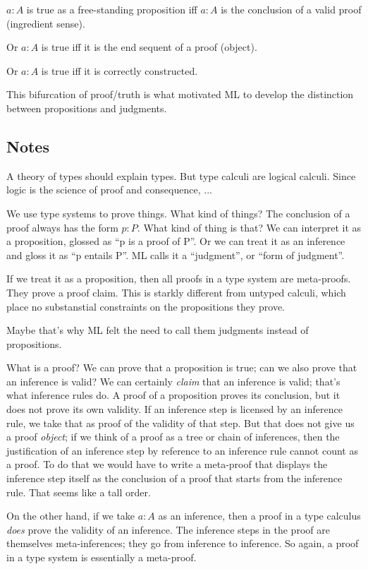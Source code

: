 \documentclass{article}
\begin{document}
 \(a:A\) is true as a free-standing proposition iff \(a:A\) is the
 conclusion of a valid proof (ingredient sense).

Or \(a:A\) is true iff it is the end sequent of a proof (object).

Or \(a:A\) is true iff it is correctly constructed.


This bifurcation of proof/truth is what motivated ML to develop the
distinction between propositions and judgments.

\subsection{Notes}
A theory of types should explain types. But type calculi are logical
calculi. Since logic is the science of proof and consequence, ...

We use type systems to prove things. What kind of things? The
conclusion of a proof always has the form \(p:P\). What kind of thing
is that? We can interpret it as a proposition, glossed as ``p is a
proof of P''. Or we can treat it as an inference and gloss it as ``p
entails P''. ML calls it a ``judgment'', or ``form of judgment''.

If we treat it as a proposition, then all proofs in a type system are
meta-proofs. They prove a proof claim. This is starkly different from
untyped calculi, which place no substanstial constraints on the
propositions they prove.

Maybe that's why ML felt the need to call them judgments instead of
propositions.

What is a proof? We can prove that a proposition is true; can we also
prove that an inference is valid? We can certainly \textit{claim} that
an inference is valid; that's what inference rules do. A proof of a
proposition proves its conclusion, but it does not prove its own
validity. If an inference step is licensed by an inference rule, we
take that as proof of the validity of that step. But that does not
give us a proof \textit{object}; if we think of a proof as a tree or
chain of inferences, then the justification of an inference step by
reference to an inference rule cannot count as a proof. To do that we
would have to write a meta-proof that displays the inference step
itself as the conclusion of a proof that starts from the inference
rule.  That seems like a tall order.

On the other hand, if we take \(a:A\) as an inference, then a proof in
a type calculus \textit{does} prove the validity of an inference. The
inference steps in the proof are themselves meta-inferences; they go
from inference to inference. So again, a proof in a type system is
essentially a meta-proof.
\end{document}
